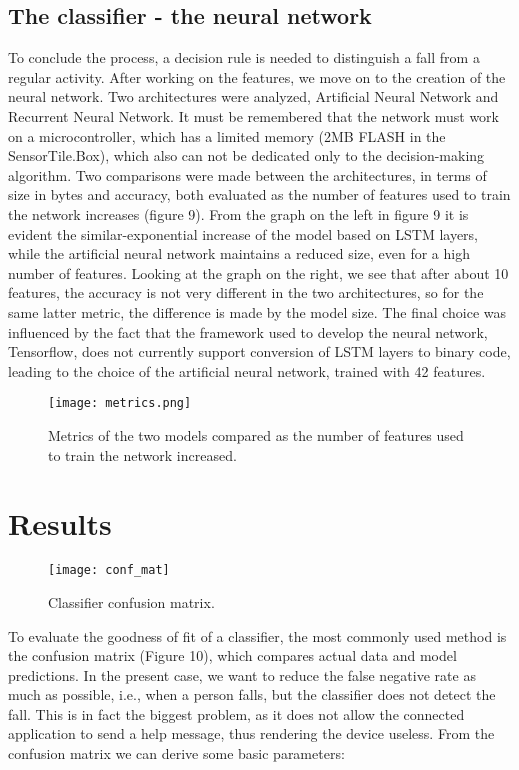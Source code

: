 \documentclass[12pt]{article}
\begin{document}
\subsection*{The classifier - the neural network}
To conclude the process, a decision rule is needed to distinguish a fall from a regular activity.
After working on the features, we move on to the creation of the neural network. Two architectures were analyzed, Artificial Neural Network and Recurrent Neural Network. It must be remembered that the network must work on a microcontroller, which has a limited memory (2MB FLASH in the SensorTile.Box), which also can not be dedicated only to the decision-making algorithm. Two comparisons were made between the architectures, in terms of size in bytes and accuracy, both evaluated as the number of features used to train the network increases (figure 9).
From the graph on the left in figure 9 it is evident the similar-exponential increase of the model based on LSTM layers, while the artificial neural network maintains a reduced size, even for a high number of features. Looking at the graph on the right, we see that after about 10 features, the accuracy is not very different in the two architectures, so for the same latter metric, the difference is made by the model size.
The final choice was influenced by the fact that the framework used to develop the neural network, Tensorflow, does not currently support conversion of LSTM layers to binary code, leading to the choice of the artificial neural network, trained with 42 features.
\begin{figure}[!h]
    \centering
    \texttt{[image: metrics.png]}
    \caption{Metrics of the two models compared as the number of features used to train the network increased.}
    \label{fig:label}
\end{figure}

\section*{\centering Results}
\begin{wrapfigure}{l}{0pt}
  \texttt{[image: conf\_mat]}
  \caption{Classifier confusion matrix.}
\end{wrapfigure}
To evaluate the goodness of fit of a classifier, the most commonly used method is the confusion matrix (Figure 10), which compares actual data and model predictions. In the present case, we want to reduce the false negative rate as much as possible, i.e., when a person falls, but the classifier does not detect the fall. This is in fact the biggest problem, as it does not allow the connected application to send a help message, thus rendering the device useless.
From the confusion matrix we can derive some basic parameters:
\end{document}
